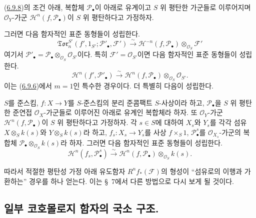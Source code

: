 \begin{corollary}[6.9.9]
\label{III.6.9.9-fr}
(\hyperref[III.6.9.8-fr]{6.9.8})의 조건 아래, 복합체
$\mathscr P_\bullet$이 아래로 유계이고 $S$ 위 평탄한 가군들로
이루어지며 $\mathscr O_Y$-가군
$\mathscr H^n(f,\mathscr P_\bullet)$이 $S$ 위 평탄하다고 가정하자.

그러면 다음 함자적인 표준 동형들이 성립한다.
\[
  \mathfrak{Tor}_n^{S'}
  (f',1_{S'};\mathscr P'_\bullet,\mathscr F')
  \xrightarrow{\sim}
  \mathscr H^{-n}(f,\mathscr P_\bullet)
  \otimes_{\mathscr O_S}\mathscr F'
  \tag{6.9.9.1}\label{III.6.9.9.1.fr}
\]
여기서
$\mathscr P'_\bullet=\mathscr P_\bullet\otimes_{\mathscr O_S}
\mathscr O_{S'}$이다. 특히 $\mathscr F'=\mathscr O_{S'}$이면 다음
함자적인 표준 동형들이 성립한다.
\[
  \mathscr H^n(f',\mathscr P'_\bullet)
  \xrightarrow{\sim}
  \mathscr H^n(f,\mathscr P_\bullet)
  \otimes_{\mathscr O_S}\mathscr O_{S'}.
  \tag{6.9.9.2}\label{III.6.9.9.2.fr}
\]
이는 (\hyperref[III.6.9.6-fr]{6.9.6})에서 $m=1$인 특수한 경우이다.
더 특별히 다음이 성립한다.
\end{corollary}

\begin{corollary}[6.9.10]
\label{III.6.9.10-fr}
$S$를 준스킴, $f:X\to Y$를 $S$-준스킴의 분리 준콤팩트
$S$-사상이라 하고, $\mathscr P_\bullet$을 $S$ 위 평탄한 준연접
$\mathscr O_X$-가군들로 이루어진 아래로 유계인 복합체라 하자.
또 $\mathscr O_Y$-가군 $\mathscr H^n(f,\mathscr P_\bullet)$이
$S$ 위 평탄하다고 가정하자. 각 $s\in S$에 대하여 $X_s$와 $Y_s$를
각각 섬유 $X\otimes_S k(s)$와 $Y\otimes_S k(s)$라 하고,
$f_s:X_s\to Y_s$를 사상 $f\times_S1$,
$\mathscr P_\bullet^s$를 $\mathscr O_{X_s}$-가군의 복합체
$\mathscr P_\bullet\otimes_{\mathscr O_S}k(s)$라 하자. 그러면 다음
함자적인 표준 동형들이 성립한다.
\[
  \mathscr H^n(f_s,\mathscr P_\bullet^s)
  \xrightarrow{\sim}
  \mathscr H^n(f,\mathscr P_\bullet)\otimes_{\mathscr O_S}k(s).
  \tag{6.9.10.1}\label{III.6.9.10.1.fr}
\]
\end{corollary}

따라서 적절한 평탄성 가정 아래 유도함자
$R^nf_*(\mathscr F)$의 형성이 “섬유로의 이행과 가환하는” 경우를
하나 얻는다. 이는 §~7에서 다른 방법으로 다시 보게 될 것이다.

\subsection{일부 코호몰로지 함자의 국소 구조.}


